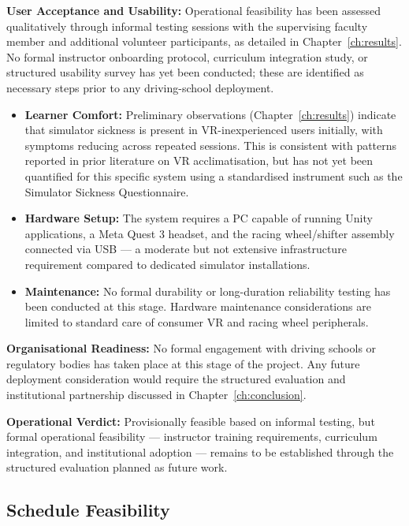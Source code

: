 \textbf{User Acceptance and Usability:}
Operational feasibility has been assessed qualitatively through informal testing sessions with the supervising faculty member and additional volunteer participants, as detailed in Chapter~\ref{ch:results}. No formal instructor onboarding protocol, curriculum integration study, or structured usability survey has yet been conducted; these are identified as necessary steps prior to any driving-school deployment.

\begin{itemize}
    \item \textbf{Learner Comfort:} Preliminary observations (Chapter~\ref{ch:results}) indicate that simulator sickness is present in VR-inexperienced users initially, with symptoms reducing across repeated sessions. This is consistent with patterns reported in prior literature on VR acclimatisation, but has not yet been quantified for this specific system using a standardised instrument such as the Simulator Sickness Questionnaire.
    \item \textbf{Hardware Setup:} The system requires a PC capable of running Unity applications, a Meta Quest 3 headset, and the racing wheel/shifter assembly connected via USB — a moderate but not extensive infrastructure requirement compared to dedicated simulator installations.
    \item \textbf{Maintenance:} No formal durability or long-duration reliability testing has been conducted at this stage. Hardware maintenance considerations are limited to standard care of consumer VR and racing wheel peripherals.
\end{itemize}

\textbf{Organisational Readiness:}
No formal engagement with driving schools or regulatory bodies has taken place at this stage of the project. Any future deployment consideration would require the structured evaluation and institutional partnership discussed in Chapter~\ref{ch:conclusion}.

\textbf{Operational Verdict:} Provisionally feasible based on informal testing, but formal operational feasibility — instructor training requirements, curriculum integration, and institutional adoption — remains to be established through the structured evaluation planned as future work.

\subsection{Schedule Feasibility}


